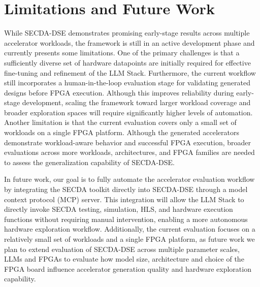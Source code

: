 
\section{Limitations and Future Work}
\label{Limitation and future work}

While SECDA-DSE demonstrates promising early-stage results across multiple accelerator workloads, the framework is still in an active development phase and currently presents some limitations. 
One of the primary challenges is that a sufficiently diverse set of hardware datapoints are initially required for effective fine-tuning and refinement of the LLM Stack. 
Furthermore, the current workflow still incorporates a human-in-the-loop evaluation stage for validating generated designs before FPGA execution. Although this improves reliability during early-stage development, scaling the framework toward larger workload coverage and broader exploration spaces will require significantly higher levels of automation. 
Another limitation is that the current evaluation covers only a small set of workloads on a single FPGA platform. Although the generated accelerators demonstrate workload-aware behavior and successful FPGA execution, broader evaluations across more workloads, architectures, and FPGA families are needed to assess the generalization capability of SECDA-DSE.

In future work, our goal is to fully automate the accelerator evaluation workflow by integrating the SECDA toolkit directly into SECDA-DSE through a model context protocol (MCP) server. This integration will allow the LLM Stack to directly invoke SECDA testing, simulation, HLS, and hardware execution functions without requiring manual intervention, enabling a more autonomous hardware exploration workflow. 
Additionally, the current evaluation focuses on a relatively small set of workloads and a single FPGA platform, as future work we plan to extend evaluation of SECDA-DSE across multiple parameter scales, LLMs and FPGAs to evaluate how model size, architecture and choice of the FPGA board influence accelerator generation quality and hardware exploration capability.